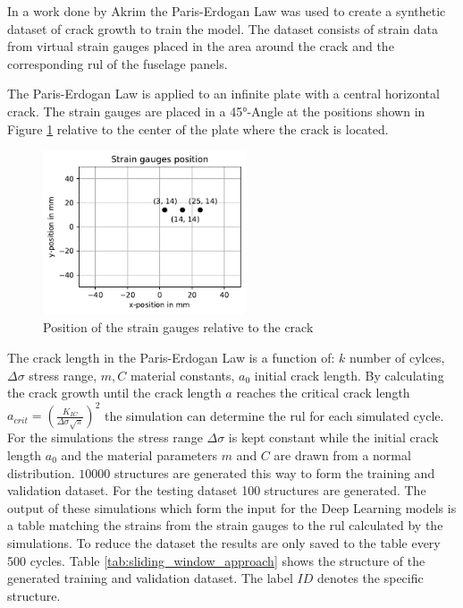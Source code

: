 \documentclass[conference]{IEEEtran}
\begin{document}
In a work done by Akrim \cite{Akrim} the Paris-Erdogan Law \cite{Paris1963} was used to create a synthetic dataset of crack growth to train the model. The dataset consists of strain data from virtual strain gauges placed in the area around the crack and the corresponding \gls{rul} of the fuselage panels.

The Paris-Erdogan Law is applied to an infinite plate with a central horizontal crack. The strain gauges are placed in a 45°-Angle at the positions shown in Figure \ref{fig:strain_gauge_positions} relative to the center of the plate where the crack is located.

\begin{figure}[htp]
	\centering
	\includegraphics[width=6cm]{python/strain_gauges_position.pdf}
	\caption{Position of the strain gauges relative to the crack}
	\label{fig:strain_gauge_positions}
\end{figure}

The crack length in the Paris-Erdogan Law is a function of: $k$ number of cylces, $\Delta \sigma$ stress range, $m, C$ material constants, $a_0$ initial crack length. By calculating the crack growth until the crack length $a$ reaches the critical crack length $a_{crit}=(\frac{K_{IC}}{\Delta \sigma \sqrt{\pi}})^2$ the simulation can determine the \gls{rul} for each simulated cycle. For the simulations the stress range $\Delta \sigma$ is kept constant while the initial crack length $a_0$ and the material parameters $m$ and $C$ are drawn from a normal distribution. $ 10 000 $ structures are generated this way to form the training and validation dataset. For the testing dataset 100 structures are generated. The output of these simulations which form the input for the Deep Learning models is a table matching the strains from the strain gauges to the \gls{rul} calculated by the simulations. To reduce the dataset the results are only saved to the table every 500 cycles. Table \ref{tab:sliding_window_approach} shows the structure of the generated training and validation dataset. The label $ ID $ denotes the specific structure.
\end{document}
